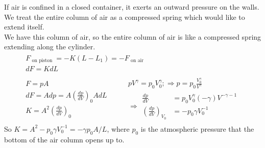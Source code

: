\documentclass[twoside,10pt]{amsart}
\newcommand{\exercisehead}[1]
  {\bigskip\bigskip
   \noindent{\large\bf Exercise #1.}
   \bigskip}
\begin{document}
\exercisehead{7.4} If air is confined in a closed container, it exerts an outward pressure on the walls.  \\
We treat the entire column of air as a compressed spring which would like to extend itself. \\
We have this column of air, so the entire column of air is like a compressed spring extending along the cylinder.  
\[
\begin{gathered}
  \begin{gathered}
    F_{\text{ on piston } } = -K(L-L_1) = -F_{ \text{ on air } } \\
    dF = K dL 
  \end{gathered} \\
\begin{gathered}
  F = pA \\
  dF = A dp = A \left( \frac{ dp}{dV} \right)_0 A dL \\
  K = A^2 \left( \frac{dp}{dV} \right)_0 
\end{gathered} \quad \quad \, 
\begin{gathered}
  pV^{\gamma} = p_0 V_0^{\gamma} ; \Longrightarrow p = p_0 \frac{V_0^{\gamma}}{V^{\gamma} } \\
  \Longrightarrow 
  \begin{aligned} 
    \frac{dp}{dV} & = p_0 V_0^{\gamma} (-\gamma) V^{-\gamma -1} \\
    \left( \frac{dp}{dV} \right)_{V_0} & = - p_0 \gamma V_0^{-1} 
  \end{aligned}
\end{gathered}
\end{gathered}
\]
So $K = A^2 -p_0 \gamma V_0^{-1} = \boxed{ -\gamma p_0 A / L }$, where $p_0$ is the atmospheric pressure that the bottom of the air column opens up to.  
\end{document}
